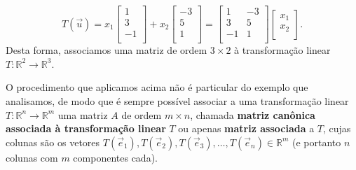 \begin{equation}
T( \vec{u} ) =
x_1 \left[
  \begin{array}{r}
    1 \\
    3 \\
    -1 \\
  \end{array}
\right] + x_2
\left[
  \begin{array}{r}
    -3 \\
     5 \\
     1 \\
  \end{array}
\right] =
\left[
  \begin{array}{rr}
    1  & -3 \\
    3  & 5  \\
    -1 & 1 \\
  \end{array}
\right]
\left[
  \begin{array}{r}
    x_1 \\
    x_2 \\
  \end{array}
\right].
\end{equation} Desta forma, associamos uma matriz de ordem $3 \times 2$ à transformação linear $T: \mathbb{R}^2 \to \mathbb{R}^3$.

O procedimento que aplicamos acima não é particular do exemplo que analisamos, de modo que é sempre possível associar a uma transformação linear $T: \mathbb{R}^n \to \mathbb{R}^m$ uma matriz $A$ de ordem $m\times n$, chamada \textbf{matriz canônica associada à transformação linear} $T$ ou apenas \textbf{matriz associada} a $T$, cujas colunas são os vetores $T(\vec{e}_1), T(\vec{e}_2), T(\vec{e}_3), \dots, T(\vec{e}_n) \in \mathbb{R}^m$ (e portanto $n$ colunas com $m$ componentes cada).


